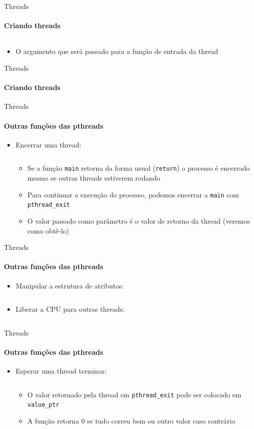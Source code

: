 \documentclass{beamer}
\begin{document}
\begin{frame}{Threads}
	\framesubtitle{Criando threads}
	\inputminted[highlightlines=4]{c}{resources/pthreadcreate.c}
	\begin{itemize}
		\item O argumento que será passado para a função de entrada da thread
	\end{itemize}
\end{frame}
\begin{frame}{Threads}
	\framesubtitle{Criando threads}
\end{frame}
\begin{frame}{Threads}
	\framesubtitle{Outras funções das pthreads}
	\begin{itemize}
		\item Encerrar uma thread:
		\inputminted{c}{resources/pthreadexit.c}
		\begin{itemize}
			\item Se a função \texttt{main} retorna da forma usual (\texttt{return}) o processo é encerrado mesmo se outras threads estiverem rodando
			\item Para continuar a execução do processo, podemos encerrar a \texttt{main} com \texttt{pthread\_exit}
			\item O valor passado como parâmetro é o valor de retorno da thread (veremos como obtê-lo)
		\end{itemize}
	\end{itemize}
\end{frame}
\begin{frame}{Threads}
	\framesubtitle{Outras funções das pthreads}
	\begin{itemize}
		\item Manipular a estrutura de atributos:
		\inputminted{c}{resources/pthreadattr.c}
		\item Liberar a CPU para outras threads:
		\inputminted{c}{resources/pthreadyield.c}
	\end{itemize}
\end{frame}
\begin{frame}{Threads}
	\framesubtitle{Outras funções das pthreads}
	\begin{itemize}
		\item Esperar uma thread terminar:
		\inputminted{c}{resources/pthreadjoin.c}
		\begin{itemize}
			\item O valor retornado pela thread em \texttt{pthread\_exit} pode ser colocado em \texttt{value\_ptr}
			\item A função retorna 0 se tudo correu bem ou outro valor caso contrário
		\end{itemize}
	\end{itemize}
\end{frame}
\end{document}
